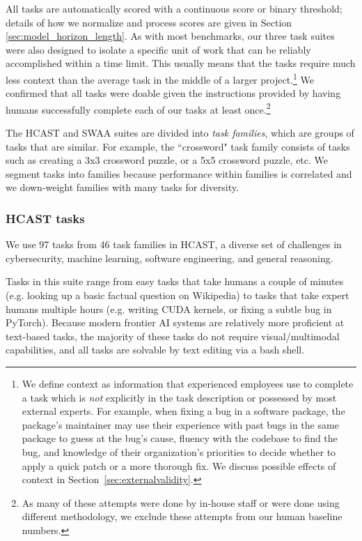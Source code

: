 \documentclass{article}
\newcommand{\gabenchmark}{HCAST}
\begin{document}
All tasks are automatically scored with a continuous score or binary threshold; details of how we normalize and process scores are given in Section \ref{sec:model_horizon_length}. As with most benchmarks, our three task suites were also designed to isolate a specific unit of work that can be reliably accomplished within a time limit. This usually means that the tasks require much less context than the average task in the middle of a larger project.\footnote{We define context as information that experienced employees use to complete a task which is \textit{not} explicitly in the task description or possessed by most external experts. For example, when fixing a bug in a software package, the package's maintainer may use their experience with past bugs in the same package to guess at the bug's cause, fluency with the codebase to find the bug, and knowledge of their organization's priorities to decide whether to apply a quick patch or a more thorough fix. We discuss possible effects of context in Section~\ref{sec:externalvalidity}.} We confirmed that all tasks were doable given the instructions provided by having humans successfully complete each of our tasks at least once.\footnote{As many of these attempts were done by in-house staff or were done using different methodology, we exclude these attempts from our human baseline numbers.}

The \gabenchmark{} and SWAA suites are divided into \textit{task families}, which are groups of tasks that are similar. For example, the ``crossword" task family consists of tasks such as creating a 3x3 crossword puzzle, or a 5x5 crossword puzzle, etc. We segment tasks into families because performance within families is correlated and we down-weight families with many tasks for diversity.

\subsubsection{\gabenchmark{} tasks}

We use 97 tasks from 46 task families in \gabenchmark{}, a diverse set of challenges in cybersecurity, machine learning, software engineering, and general reasoning.

Tasks in this suite range from easy tasks that take humans a couple of minutes (e.g. looking up a basic factual question on Wikipedia) to tasks that take expert humans multiple hours (e.g. writing CUDA kernels, or fixing a subtle bug in PyTorch). Because modern frontier AI systems are relatively more proficient at text-based tasks, the majority of these tasks do not require visual/multimodal capabilities, and all tasks are solvable by text editing via a bash shell. 
\end{document}
